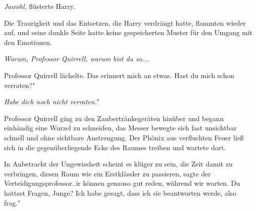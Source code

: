 \glqq{}\emph{Jawohl}\grqq{}, flüsterte Harry.

Die Traurigkeit und das Entsetzen, die Harry verdrängt hatte, flammten wieder
auf, und seine dunkle Seite hatte keine gespeicherten Muster für den Umgang mit
den Emotionen.

\emph{Warum, Professor Quirrell, warum bist du so...}

Professor Quirrell lächelte. \glqq{}Das erinnert mich an etwas. Hast du mich
schon verraten?"

\glqq{}\emph{Habe dich noch nicht verraten.}"

Professor Quirrell ging zu den Zaubertränkegeräten hinüber und begann einhändig
eine Wurzel zu schneiden, das Messer bewegte sich fast unsichtbar schnell und
ohne sichtbare Anstrengung. Der Phönix aus verfluchten Feuer ließ sich in die
gegenüberliegende Ecke des Raumes treiben und wartete dort.

\glqq{}In Anbetracht der Ungewissheit scheint es klüger zu sein, die Zeit damit
zu verbringen, diesen Raum wie ein Erstklässler zu passieren\grqq{}, sagte der
Verteidigungsprofessor.\grqq{}.ir können genauso gut reden, während wir warten.
Du hattest Fragen, Junge? Ich habe gesagt, dass ich sie beantworten werde, also
frag."

